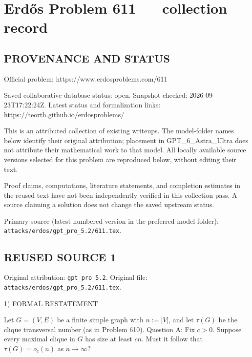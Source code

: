 \section*{Erd\H{o}s Problem 611 --- collection record}

\subsection*{PROVENANCE AND STATUS}
Official problem: https://www.erdosproblems.com/611

Saved collaborative-database status: open.
Snapshot checked: 2026-09-23T17:22:24Z.
Latest status and formalization links: https://teorth.github.io/erdosproblems/

This is an attributed collection of existing writeups. The model-folder names below identify their original attribution; placement in GPT\_6\_Astra\_Ultra does not attribute their mathematical work to that model. All locally available source versions selected for this problem are reproduced below, without editing their text.

Proof claims, computations, literature statements, and completion estimates in the reused text have not been independently verified in this collection pass. A source claiming a solution does not change the saved upstream status.

Primary source (latest numbered version in the preferred model folder): \texttt{attacks/erdos/gpt\_pro\_5.2/611.tex}.

\subsection*{REUSED SOURCE 1}
Original attribution: \texttt{gpt\_pro\_5.2}.
Original file: \texttt{attacks/erdos/gpt\_pro\_5.2/611.tex}.


1) FORMAL RESTATEMENT

Let $G=(V,E)$ be a finite simple graph with $n:=|V|$, and let $\tau(G)$ be the clique transversal number (as in Problem 610).
Question A: Fix $c>0$. Suppose every maximal clique in $G$ has size at least $cn$.
Must it follow that $\tau(G)=o_c(n)$ as $n\to\infty$?

